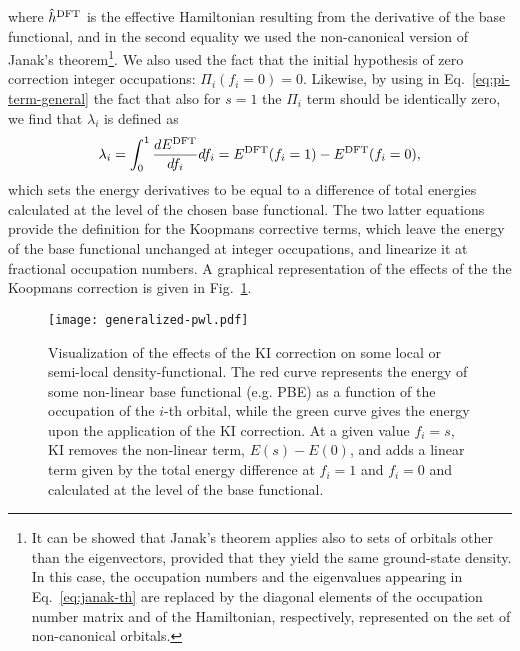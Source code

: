 %
where $\hat{h}^{\rm DFT}$ is the effective Hamiltonian resulting from the derivative of the base functional, and in the second equality we used the non-canonical version of Janak's theorem\footnote{It can be showed that Janak's theorem applies also to sets of orbitals other than the eigenvectors, provided that they yield the same ground-state density. In this case, the occupation numbers and the eigenvalues appearing in Eq.~\eqref{eq:janak-th} are replaced by the diagonal elements of the occupation number matrix and of the Hamiltonian, respectively, represented on the set of non-canonical orbitals.}. We also used the fact that the initial hypothesis of zero correction integer occupations: $\Pi_i(f_i=0) = 0$. Likewise, by using in Eq.~\eqref{eq:pi-term-general} the fact that also for $s=1$ the $\Pi_i$ term should be identically zero, we find that $\lambda_i$ is defined as
%
\begin{equation}
    \lambda_i = \int_0^{1} \frac{dE^{\rm DFT}}{df_i} df_i = E^{\rm DFT}(f_i=1) - E^{\rm DFT}(f_i=0) ,
    \label{eq:lambda-definition}
\end{equation}
%
which sets the energy derivatives to be equal to a difference of total energies calculated at the level of the chosen base functional. The two latter equations provide the definition for the Koopmans corrective terms, which leave the energy of the base functional unchanged at integer occupations, and linearize it at fractional occupation numbers. A graphical representation of the effects of the the Koopmans correction is given in Fig.~\ref{fig:kc-correction-visual}.

\begin{figure}
    \centering
    \texttt{[image: generalized-pwl.pdf]}
    \caption[Graphical representation of the KI correction.]{Visualization of the effects of the KI correction on some local or semi-local density-functional. The red curve represents the energy of some non-linear base functional (e.g. PBE) as a function of the occupation of the $i$-th orbital, while the green curve gives the energy upon the application of the KI correction. At a given value $f_i=s$, KI removes the non-linear term, $E(s)-E(0)$, and adds a linear term given by the total energy difference at $f_i=1$ and $f_i=0$ and calculated at the level of the base functional.}
    \label{fig:kc-correction-visual}
\end{figure}

